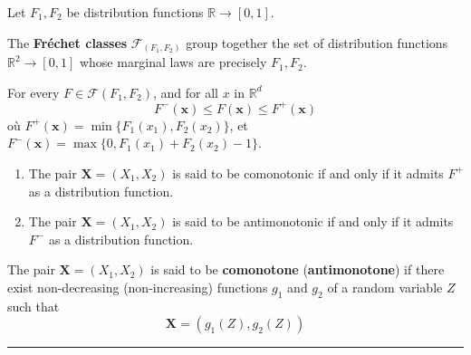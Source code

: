 \begin{f}
Let $F_1,F_2$ be distribution functions $\mathbb{R}\rightarrow [0,1]$.

The \textbf{Fréchet classes} $\mathcal{F}_{(F_1,F_2)}$ group together the set of distribution functions $\mathbb{R}^2\rightarrow [0,1]$
whose marginal laws are precisely $F_1,F_2$.
	
For every $F \in \mathcal{F} (F_1,F_2)$, and for all $x$ in $\mathbb{R}^d$
$$
F^-(\boldsymbol{x})\leq F (\boldsymbol{x})\leq F^+(\boldsymbol{x})
$$
où $F^+(\boldsymbol{x}) = \min \{F_1(x_1),F_2(x_2)\}$, et 
$F^-(\boldsymbol{x}) = \max\{0,F_1(x_1) +F_2(x_2)-1\}$.



\begin{enumerate}
	\item The pair $\boldsymbol{X}=(X_1,X_2)$ is said to be comonotonic if and only if it admits $F^+$ as a distribution function.
	\item The pair $\boldsymbol{X}=(X_1,X_2)$ is said to be antimonotonic if and only if it admits $F^-$ as a distribution function.
\end{enumerate}

The pair $\boldsymbol{X}=(X_1,X_2)$ is said to be \textbf{comonotone} (\textbf{antimonotone}) if there exist non-decreasing (non-increasing) functions $g_1$ and $g_2$ of a random variable $Z$ such that
$$
\boldsymbol{X}=(g_1(Z),g_2(Z))
$$
\end{f}
\hrule


